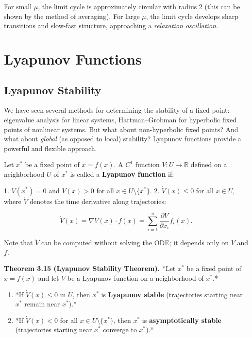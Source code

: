 For small $\mu$, the limit cycle is approximately circular with radius 2 (this can be shown by the method of averaging). For large $\mu$, the limit cycle develops sharp transitions and slow-fast structure, approaching a \textit{relaxation oscillation}.


\bigskip


\section{Lyapunov Functions}\label{sec:3.7}

\subsection{Lyapunov Stability}\label{sec:3.7.1}

We have seen several methods for determining the stability of a fixed point: eigenvalue analysis for linear systems, Hartman--Grobman for hyperbolic fixed points of nonlinear systems. But what about non-hyperbolic fixed points? And what about \textit{global} (as opposed to local) stability? Lyapunov functions provide a powerful and flexible approach.

\begin{definition}\label{def:3.14.}
Let $x^*$ be a fixed point of $\dot{x} = f(x)$. A $C^1$ function $V: U \to \mathbb{R}$ defined on a neighborhood $U$ of $x^*$ is called a \textbf{Lyapunov function} if:

1. $V(x^*) = 0$ and $V(x) > 0$ for all $x \in U \setminus \{x^*\}$.
2. $\dot{V}(x) \leq 0$ for all $x \in U$, where $\dot{V}$ denotes the time derivative along trajectories:

\[
\dot{V}(x) = \nabla V(x) \cdot f(x) = \sum_{i=1}^n \frac{\partial V}{\partial x_i} f_i(x).
\]

Note that $\dot{V}$ can be computed without solving the ODE; it depends only on $V$ and $f$.
\end{definition}


\textbf{Theorem 3.15 (Lyapunov Stability Theorem).} *Let $x^*$ be a fixed point of $\dot{x} = f(x)$ and let $V$ be a Lyapunov function on a neighborhood of $x^*$.*

\begin{enumerate}[nosep]
  \item *If $\dot{V}(x) \leq 0$ in $U$, then $x^*$ is \textbf{Lyapunov stable} (trajectories starting near $x^*$ remain near $x^*$).*
  \item *If $\dot{V}(x) < 0$ for all $x \in U \setminus \{x^*\}$, then $x^*$ is \textbf{asymptotically stable} (trajectories starting near $x^*$ converge to $x^*$).*
\end{enumerate}

